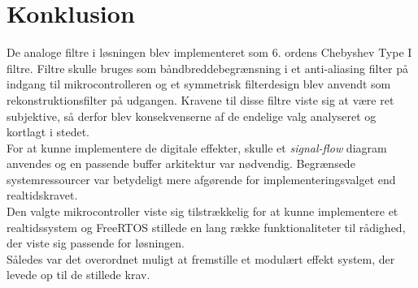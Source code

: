 \chapter{Konklusion} \label{kap:konklusion}

De analoge filtre i løsningen blev implementeret som 6. ordens Chebyshev Type I filtre. Filtre skulle bruges som båndbreddebegrænsning i et anti-aliasing filter på indgang til mikrocontrolleren og et symmetrisk filterdesign blev anvendt som rekonstruktionsfilter på udgangen.
Kravene til disse filtre viste sig at være ret subjektive, så derfor blev konsekvenserne af de endelige valg analyseret og kortlagt i stedet. 
\\
For at kunne implementere de digitale effekter, skulle et \textit{signal-flow} diagram anvendes og en passende buffer arkitektur var nødvendig. 
Begrænsede systemressourcer var betydeligt mere afgørende for implementeringsvalget end realtidskravet. 
\\	
Den valgte mikrocontroller viste sig tilstrækkelig for at kunne implementere et realtidssystem og FreeRTOS stillede en lang række funktionaliteter til rådighed, der viste sig passende for løsningen. 
\\
Således var det overordnet muligt at fremstille et modulært effekt system, der levede op til de stillede krav.

